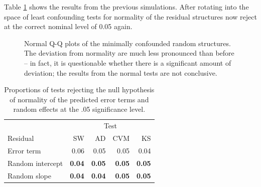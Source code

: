 \documentclass{article} %
\begin{document}
Table \ref{tab:edf2} shows the results from the previous simulations. After rotating into the space of least confounding tests for normality of the residual structures now  reject at the correct nominal level of 0.05 again.


\begin{figure}[htb]
	\centering
	\caption{\label{fig:lcqq} Normal Q-Q plots of the minimally confounded random structures. The deviation from normality are much less pronounced than before -- in fact, it is questionable whether there is a significant amount of deviation; the results from the normal tests are not conclusive.}
\end{figure}

\begin{table}[ht]
\caption{\label{tab:edf2} Proportions of tests rejecting the null hypothesis of normality of the predicted error terms and random effects at the .05 significance level. 
}
\begin{center}
\begin{tabular}{l rrrr} \hline
 & \multicolumn{4}{c}{Test} \\  \cline{2-5}
 Residual & SW &  AD & CVM & KS \\ \hline
Error term			& 0.06 & 0.05 & 0.05 & 0.04 \\
Random intercept 	& \bf 0.04 & \bf 0.05 & \bf 0.05 & \bf 0.05 \\
Random slope 		& \bf 0.04 & \bf 0.04 & \bf 0.05 & \bf 0.05 \\
   \hline
\end{tabular}
\end{center}
\end{table}
\end{document}
